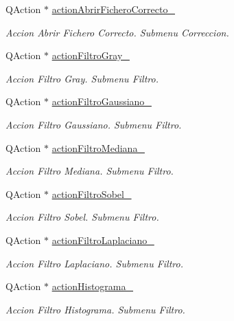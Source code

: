 \begin{DoxyCompactItemize}
Q\+Action $\ast$ \hyperlink{classCAplicacion_abd9f33aa366727875ab9c798e1a4695c}{action\+Abrir\+Fichero\+Correcto\+\_\+}
\begin{DoxyCompactList}\small\item\em Accion Abrir Fichero Correcto. Submenu Correccion. \end{DoxyCompactList}\item 
Q\+Action $\ast$ \hyperlink{classCAplicacion_a62326cfe231c222d4d3411b4f9a5fc81}{action\+Filtro\+Gray\+\_\+}
\begin{DoxyCompactList}\small\item\em Accion Filtro Gray. Submenu Filtro. \end{DoxyCompactList}\item 
Q\+Action $\ast$ \hyperlink{classCAplicacion_ae6827414fe74e31b2216ec04f61ad21f}{action\+Filtro\+Gaussiano\+\_\+}
\begin{DoxyCompactList}\small\item\em Accion Filtro Gaussiano. Submenu Filtro. \end{DoxyCompactList}\item 
Q\+Action $\ast$ \hyperlink{classCAplicacion_a7121918f17fc9640c91f26961f7ee221}{action\+Filtro\+Mediana\+\_\+}
\begin{DoxyCompactList}\small\item\em Accion Filtro Mediana. Submenu Filtro. \end{DoxyCompactList}\item 
Q\+Action $\ast$ \hyperlink{classCAplicacion_a96511c94f6a4a6da0466d460272f56bf}{action\+Filtro\+Sobel\+\_\+}
\begin{DoxyCompactList}\small\item\em Accion Filtro Sobel. Submenu Filtro. \end{DoxyCompactList}\item 
Q\+Action $\ast$ \hyperlink{classCAplicacion_ad1cce3c330ee913f1129d19bba5f22f0}{action\+Filtro\+Laplaciano\+\_\+}
\begin{DoxyCompactList}\small\item\em Accion Filtro Laplaciano. Submenu Filtro. \end{DoxyCompactList}\item 
Q\+Action $\ast$ \hyperlink{classCAplicacion_a60f0707037ad02949ff17858729faff2}{action\+Histograma\+\_\+}
\begin{DoxyCompactList}\small\item\em Accion Filtro Histograma. Submenu Filtro. \end{DoxyCompactList}\item 

\end{DoxyCompactItemize}
